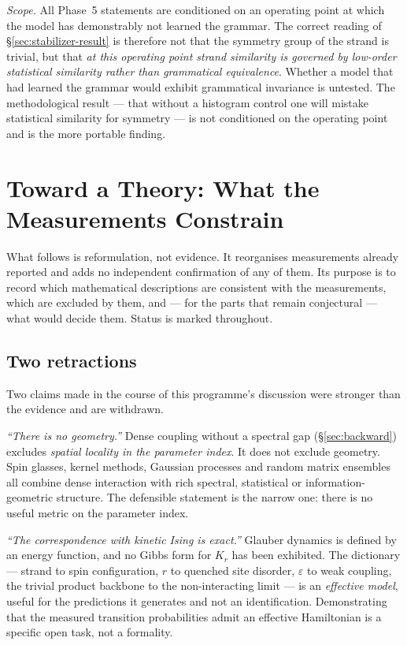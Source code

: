 \emph{Scope.} All Phase~5 statements are conditioned on an operating point at
which the model has demonstrably not learned the grammar. The correct reading
of \S\ref{sec:stabilizer-result} is therefore not that the symmetry group of
the strand is trivial, but that \emph{at this operating point strand similarity
is governed by low-order statistical similarity rather than grammatical
equivalence}. Whether a model that had learned the grammar would exhibit
grammatical invariance is untested. The methodological result ---
that without a histogram control one will mistake statistical similarity for
symmetry --- is not conditioned on the operating point and is the more portable
finding.

\section{Toward a Theory: What the Measurements Constrain}
\label{sec:theory}

What follows is reformulation, not evidence. It reorganises measurements
already reported and adds no independent confirmation of any of them. Its
purpose is to record which mathematical descriptions are consistent with the
measurements, which are excluded by them, and --- for the parts that remain
conjectural --- what would decide them. Status is marked throughout.

\subsection{Two retractions}
\label{sec:retractions}

Two claims made in the course of this programme's discussion were stronger than
the evidence and are withdrawn.

\emph{``There is no geometry.''} Dense coupling without a spectral gap
(\S\ref{sec:backward}) excludes \emph{spatial locality in the parameter index}.
It does not exclude geometry. Spin glasses, kernel methods, Gaussian processes
and random matrix ensembles all combine dense interaction with rich spectral,
statistical or information-geometric structure. The defensible statement is the
narrow one: there is no useful metric on the parameter index.

\emph{``The correspondence with kinetic Ising is exact.''} Glauber dynamics is
defined by an energy function, and no Gibbs form for $K_r$ has been exhibited.
The dictionary --- strand to spin configuration, $r$ to quenched site disorder,
$\varepsilon$ to weak coupling, the trivial product backbone to the
non-interacting limit --- is an \emph{effective model}, useful for the
predictions it generates and not an identification. Demonstrating that the
measured transition probabilities admit an effective Hamiltonian is a specific
open task, not a formality.

